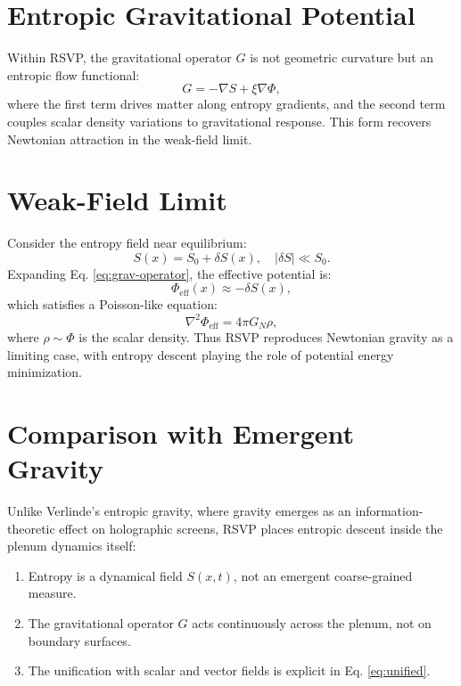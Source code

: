 \documentclass[12pt]{report}
\begin{document}
\section{Entropic Gravitational Potential}
Within RSVP, the gravitational operator \(G\) is not geometric curvature but an entropic flow functional:
\begin{equation}
G = -\nabla S + \xi \nabla \Phi, \label{eq:grav-operator}
\end{equation}
where the first term drives matter along entropy gradients, and the second term couples scalar density variations to gravitational response. This form recovers Newtonian attraction in the weak-field limit.

\section{Weak-Field Limit}
Consider the entropy field near equilibrium:
\begin{equation}
S(x) = S_0 + \delta S(x), \quad |\delta S| \ll S_0.
\end{equation}
Expanding Eq. \eqref{eq:grav-operator}, the effective potential is:
\begin{equation}
\Phi_{\text{eff}}(x) \approx - \delta S(x),
\end{equation}
which satisfies a Poisson-like equation:
\begin{equation}
\nabla^2 \Phi_{\text{eff}} = 4 \pi G_N \rho,
\end{equation}
where \(\rho \sim \Phi\) is the scalar density. Thus RSVP reproduces Newtonian gravity as a limiting case, with entropy descent playing the role of potential energy minimization.

\section{Comparison with Emergent Gravity}
Unlike Verlinde’s entropic gravity, where gravity emerges as an information-theoretic effect on holographic screens, RSVP places entropic descent inside the plenum dynamics itself:
\begin{enumerate}
    \item Entropy is a dynamical field \(S(x,t)\), not an emergent coarse-grained measure.
    \item The gravitational operator \(G\) acts continuously across the plenum, not on boundary surfaces.
    \item The unification with scalar and vector fields is explicit in Eq. \eqref{eq:unified}.
\end{enumerate}
\end{document}
